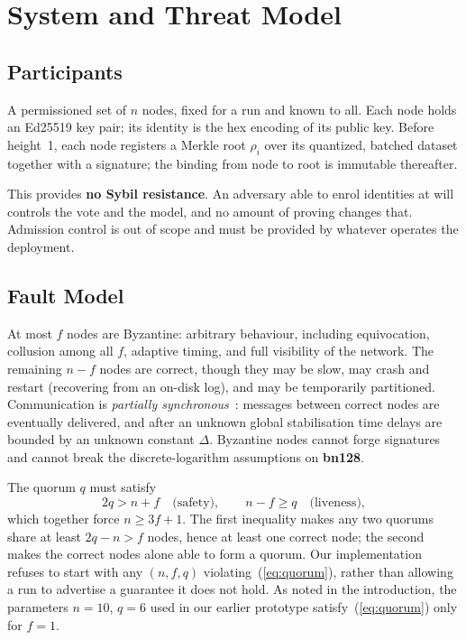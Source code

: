 \documentclass{llncs}
\begin{document}
\section{System and Threat Model}
\label{sec:model}

\subsection{Participants}

A permissioned set of $n$ nodes, fixed for a run and known to all. Each node
holds an Ed25519 key pair; its identity is the hex encoding of its public key.
Before height~1, each node registers a Merkle root $\rho_i$ over its quantized,
batched dataset together with a signature; the binding from node to root is
immutable thereafter.

This provides \textbf{no Sybil resistance}. An adversary able to enrol
identities at will controls the vote and the model, and no amount of proving
changes that. Admission control is out of scope and must be provided by whatever
operates the deployment.

\subsection{Fault Model}

At most $f$ nodes are Byzantine: arbitrary behaviour, including equivocation,
collusion among all $f$, adaptive timing, and full visibility of the network.
The remaining $n-f$ nodes are correct, though they may be slow, may crash and
restart (recovering from an on-disk log), and may be temporarily partitioned.
Communication is \emph{partially synchronous}~\cite{dwork1988partialsynchrony}:
messages between correct nodes are eventually delivered, and after an unknown
global stabilisation time delays are bounded by an unknown constant $\Delta$.
Byzantine nodes cannot forge signatures and cannot break the discrete-logarithm
assumptions on \textbf{bn128}.

The quorum $q$ must satisfy
\begin{equation}
  2q > n + f \quad \text{(safety)}, \qquad n - f \geq q \quad \text{(liveness)},
  \label{eq:quorum}
\end{equation}
which together force $n \geq 3f+1$. The first inequality makes any two quorums
share at least $2q-n > f$ nodes, hence at least one correct node; the second
makes the correct nodes alone able to form a quorum. Our implementation refuses
to start with any $(n, f, q)$ violating~(\ref{eq:quorum}), rather than allowing a
run to advertise a guarantee it does not hold. As noted in the introduction, the
parameters $n=10$, $q=6$ used in our earlier prototype satisfy~(\ref{eq:quorum})
only for $f=1$.
\end{document}
